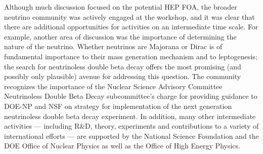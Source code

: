 Although much discussion focused on the potential HEP FOA, the broader
neutrino community was actively
engaged at the workshop, and it was clear that there are additional
opportunities for activities on an intermediate time scale.
For example, another area of discussion was
the importance of determining the nature of the neutrino.  Whether
neutrinos are Majorana or Dirac is of fundamental importance to their
mass generation mechanism and to leptogenesis; the search for
neutrinoless double beta decay offers the most promising (and possibly
only plausible) avenue for addressing this question.  The community
recognizes the importance of the Nuclear Science Advisory Committee
Neutrinoless Double Beta Decay subcommittee's charge for providing
guidance to DOE-NP and NSF on strategy for implementation of the next
generation neutrinoless double beta decay experiment.  In addition, many other
intermediate activities --- including R\&D, theory, experiments and
contributions to a variety of international efforts --- are supported
by the National Science Foundation and the DOE Office of Nuclear
Physics as well as the Office of High Energy Physics.









